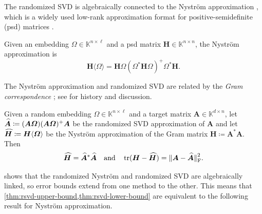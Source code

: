 \documentclass[11pt]{article}
\newcommand{\field}{\mathbb{K}}
\DeclareMathOperator{\tr}{tr}
\newcommand{\mat}[1]{\boldsymbol{#1}}
\newcommand{\norm}[1]{\mleft\| #1 \mright\|}
\newcommand{\hatbold}[1]{%
  \skew{4}\widehat{\smash{\boldsymbol{#1}}\mathstrut}}
\newcommand{\Ahat}{\smash{\hatbold{A}}}
\newcommand{\Hhat}{\smash{\hatbold{H}}}
\theoremstyle{definition}
\numberwithin{equation}{section}
\begin{document}
The randomized SVD is algebraically connected to the Nystr\"om approximation \cite{WS00,DM05,HMT11,GM13,TYUC17b}, which is a widely used low-rank approximation format for positive-semidefinite (psd) matrices \cite[Lem.~5.1]{TW23a}.

%
\begin{definition}
    Given an embedding $\mat{\varOmega} \in \field^{n \times \ell}$ and a psd matrix $\mat{H} \in \field^{n\times n}$, the Nystr\"om approximation is 
    \begin{equation*}
        \mat{H} \langle \mat{\varOmega} \rangle = \mat{H}\mat{\varOmega} (\mat{\varOmega}^*\mat{H}\mat{\varOmega})^+ \mat{\varOmega}^*\mat{H}.
    \end{equation*}
\end{definition}
%

\noindent The Nystr\"om approximation and randomized SVD are related by the \emph{Gram correspondence} \cite{Git11}; see \cite[sec.~2.6]{Epp25a} for history and discussion.

\begin{fact} \label{fact:gram-correspondence}
    Given a random embedding $\mat{\varOmega} \in \field^{n \times \ell}$ and a target matrix $\mat{A} \in \field^{d \times n}$, let $\Ahat \coloneqq (\mat{A} \mat{\varOmega}) (\mat{A} \mat{\varOmega})^+ \mat{A}$ be the randomized SVD approximation of $\mat{A}$ and let $\Hhat \coloneqq \mat{H}\langle \mat{\varOmega} \rangle$ be the Nystr\"om approximation of the Gram matrix $\mat{H} \coloneqq \mat{A}^* \mat{A}$.
    Then
    \begin{equation*}
        \Hhat = \Ahat^* \Ahat \quad \text{and} \quad \tr(\mat{H} - \Hhat) = \norm{\mat{A} - \Ahat}_{\rm F}^2.
    \end{equation*}
\end{fact}
%

 shows that the randomized Nystr\"om and randomized SVD are algebraically linked, so error bounds extend from one method to the other.
This means that \cref{thm:rsvd-upper-bound,thm:rsvd-lower-bound} are equivalent to the following result for Nystr\"om approximation.
\end{document}
